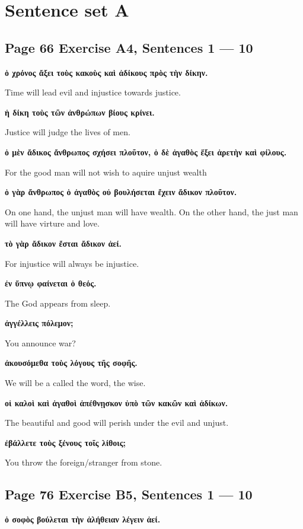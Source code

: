 \section*{Sentence set A}
\subsection*{Page 66 Exercise A4, Sentences 1 --- 10}
\noindent\textbf{ὁ χρόνος ἄξει τοὺς κακοὺς καὶ ἀδίκους πρὸς τὴν δίκην.}

Time will lead evil and injustice towards justice.

\noindent\textbf{ἡ δίκη τοὺς τῶν ἀνθρώπων βίους κρίνει.}

Justice will judge the lives of men.

\noindent\textbf{ὁ μὲν ἄδικος ἄνθρωπος σχήσει πλοῦτον, ὁ δὲ ἀγαθὸς ἕξει ἀρετὴν καὶ φίλους.}

For the good man will not wish to aquire unjust wealth

\noindent\textbf{ὁ γὰρ ἄνθρωπος ὁ ἀγαθὸς οὐ βουλήσεται ἔχειν ἄδικον πλοῦτον.}

On one hand, the unjust man will have wealth. On the other hand, the just man will have virture and love.

\noindent\textbf{τὸ γὰρ ἄδικον ἔσται ἄδικον ἀεί.}

For injustice will always be injustice.

\noindent\textbf{ἐν ὕπνῳ φαίνεται ὁ θεός.}

The God appears from sleep.

\noindent\textbf{ἀγγέλλεις πόλεμον;}

You announce war?

\noindent\textbf{ἀκουσόμεθα τοὺς λόγους τῆς σοφῆς.}

We will be a called the word, the wise.

\noindent\textbf{οἱ καλοὶ καὶ ἀγαθοὶ ἀπέθνῃσκον ὑπὸ τῶν κακῶν καὶ ἀδίκων.}

The beautiful and good will perish under the evil and unjust.

\noindent\textbf{ἐβάλλετε τοὺς ξένους τοῖς λίθοις;}

You throw the foreign/stranger from stone.

\subsection*{Page 76 Exercise B5, Sentences 1 --- 10}
\noindent\textbf{ὁ σοφὸς βούλεται τὴν ἀλήθειαν λέγειν ἀεί.}


